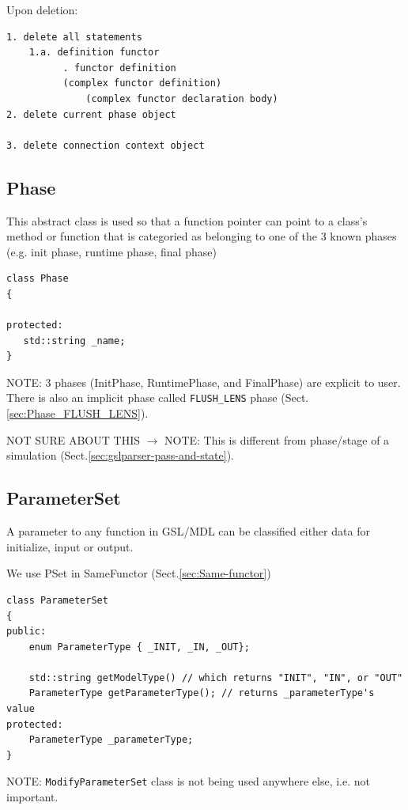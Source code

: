 Upon deletion:
\begin{verbatim}
1. delete all statements
    1.a. definition functor 
          . functor definition
          (complex functor definition)
              (complex functor declaration body)
2. delete current phase object

3. delete connection context object
\end{verbatim}

\subsection{Phase}
\label{sec:Phase-GSL}

This abstract class is used so that a function pointer can point to a class's
method or function that is categoried as belonging to one of the 3 known phases
 (e.g. init phase, runtime phase, final phase)
\begin{lstlisting}
class Phase
{

protected:
   std::string _name;
}
\end{lstlisting}

NOTE: 3 phases (InitPhase, RuntimePhase, and FinalPhase) are explicit to user. There is
also an implicit phase called \verb!FLUSH_LENS! phase (Sect.\ref{sec:Phase_FLUSH_LENS}).

NOT SURE ABOUT THIS $\rightarrow$ NOTE: This is different from phase/stage of a
simulation (Sect.\ref{sec:gslparser-pass-and-state}).

\subsection{ParameterSet}
\label{sec:ParameterSet}

A parameter to any function in GSL/MDL can be classified either 
data for initialize, input or output. 

We use PSet in SameFunctor (Sect.\ref{sec:Same-functor})
 
\begin{lstlisting}
class ParameterSet
{
public:
	enum ParameterType { _INIT, _IN, _OUT};
	
	std::string getModelType() // which returns "INIT", "IN", or "OUT"
	ParameterType getParameterType(); // returns _parameterType's value	
protected:
	ParameterType _parameterType;
}
\end{lstlisting}

NOTE: \verb!ModifyParameterSet! class is not being used anywhere else, i.e. not
important. 


